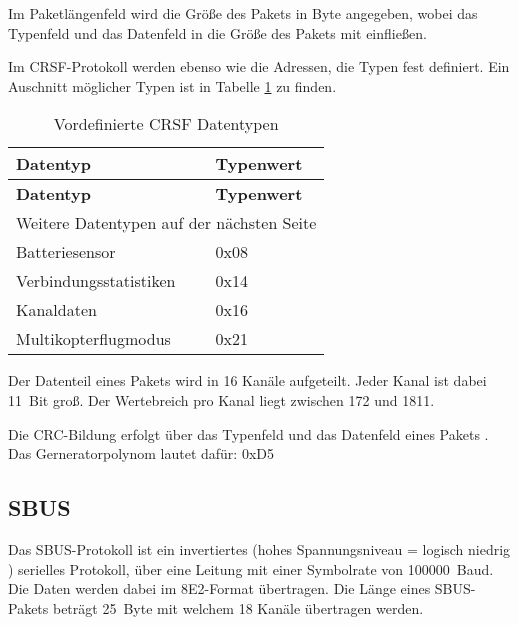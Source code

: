 Im Paketlängenfeld wird die Größe des Pakets in Byte angegeben, wobei das Typenfeld und das Datenfeld in die Größe des Pakets mit einfließen. \cite{cleanflightCrsf}

Im CRSF-Protokoll werden ebenso wie die Adressen, die Typen fest definiert. Ein Auschnitt möglicher Typen ist in Tabelle \ref{table:crsfTyp} zu finden.

\begin{longtable}[c]{|l|l|}
    \caption{Vordefinierte CRSF Datentypen \cite{cleanflightCrsfP}}
    \label{table:crsfTyp}\\
    \hline
    \textbf{Datentyp} & \textbf{Typenwert}\\
    \hline
    \hline
    \endfirsthead

    \hline
    \textbf{Datentyp} & \textbf{Typenwert}\\
    \hline
    \hline
    \endhead

    \hline
    \multicolumn{2}{|r|}{Weitere Datentypen auf der nächsten Seite}\\
    \hline
    \endfoot

    \hline
    \endlastfoot
    
    Batteriesensor & 0x08 \\
    \hline
    Verbindungsstatistiken & 0x14 \\
    \hline
    Kanaldaten & 0x16 \\
    \hline
    Multikopterflugmodus & 0x21 \\
\end{longtable}

Der Datenteil eines Pakets wird in 16 Kanäle aufgeteilt. Jeder Kanal ist dabei 11~Bit groß. Der Wertebreich pro Kanal liegt zwischen 172 und 1811. \cite{cleanflightCrsf}

Die CRC-Bildung erfolgt über das Typenfeld und das Datenfeld eines Pakets \cite{cleanflightCrsf}. Das Gerneratorpolynom lautet dafür: 0xD5 \cite{cleanflightCRC}

\subsection{SBUS}

Das SBUS-Protokoll ist ein invertiertes (hohes Spannungsniveau = logisch niedrig \cite{sigrokSBus}) serielles Protokoll, über eine Leitung mit einer Symbolrate von 100000~Baud. Die Daten werden dabei im 8E2-Format übertragen. Die Länge eines SBUS-Pakets beträgt 25~Byte mit welchem 18 Kanäle übertragen werden. \cite{BolderFlight}

